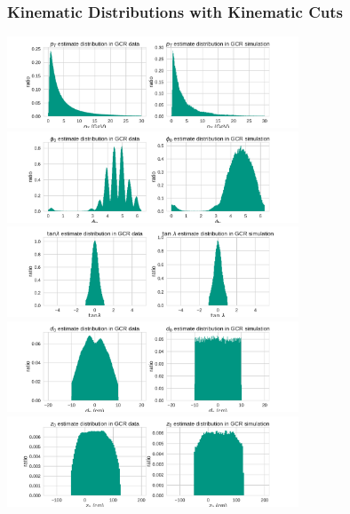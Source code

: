 \documentclass[18pt]{beamer}
\begin{document}
    \begin{frame}[allowframebreaks]
    \frametitle{Kinematic Distributions with Kinematic Cuts}
    \begin{center}
      \includegraphics[width=0.65\textwidth]{figures/distributions/gcr_pt_distribution_cut.pdf}\\
      \includegraphics[width=0.65\textwidth]{figures/distributions/gcr_phi0_distribution_cut.pdf}\\
      \includegraphics[width=0.65\textwidth]{figures/distributions/gcr_tan_lambda_distribution_cut.pdf}\\
      \includegraphics[width=0.65\textwidth]{figures/distributions/gcr_d0_distribution_cut.pdf}\\
      \includegraphics[width=0.65\textwidth]{figures/distributions/gcr_z0_distribution_cut.pdf}

    \end{center}
  \end{frame}
\end{document}
